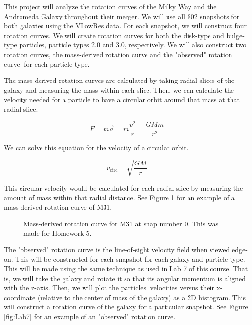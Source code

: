 \documentclass[twocolumn,linenumbers,trackchanges]{aastex7}
\begin{document}
This project will analyze the rotation curves of the Milky Way and the Andromeda Galaxy throughout their merger. 
We will use all 802 snapshots for both galaxies using the VLowRes data. For each snapshot, we will construct four rotation curves.
We will create rotation curves for both the disk-type and bulge-type particles, particle types 2.0 and 3.0, respectively.
We will also construct two rotation curves, the mass-derived rotation curve and the "observed" rotation curve, for each particle type.

The mass-derived rotation curves are calculated by taking radial slices of the galaxy and measuring the mass within each slice. Then, we can calculate the velocity needed for a particle to have a circular orbit around that mass at that radial slice.

\begin{equation}
	F=m\overrightarrow{a}=m\frac{v^2}{r}=\frac{GMm}{r^2}
\end{equation}

We can solve this equation for the velocity of a circular orbit.

\begin{equation}
	v_{\text{circ}}=\sqrt{\frac{GM}{r}} \label{eq:vcirc}
\end{equation}

This circular velocity would be calculated for each radial slice by measuring the amount of mass within that radial distance.
See Figure \ref{fig:HW5} for an example of a mass-derived rotation curve of M31.

\begin{figure}[ht!]
	\caption{Mass-derived rotation curve for M31 at snap number 0. This was made for Homework 5.}
	\label{fig:HW5}
\end{figure}

The "observed" rotation curve is the line-of-sight velocity field when viewed edge-on. This will be constructed for each snapshot for each galaxy and particle type.
This will be made using the same technique as used in Lab 7 of this course. 
That is, we will take the galaxy and rotate it so that its angular momentum is aligned with the z-axis. 
Then, we will plot the particles' velocities versus their x-coordinate (relative to the center of mass of the galaxy) as a 2D histogram. 
This will construct a rotation curve of the galaxy for a particular snapshot. See Figure \ref{fig:Lab7} for an example of an "observed" rotation curve.
\end{document}
